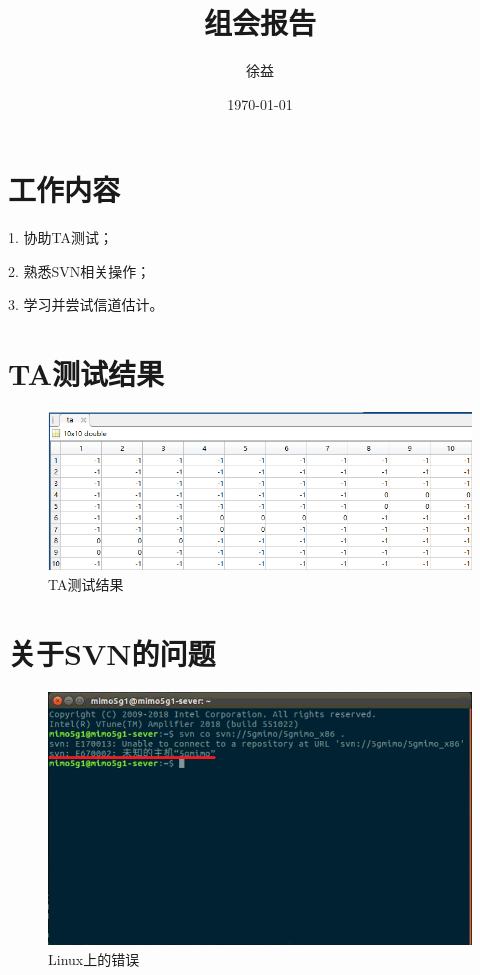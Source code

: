 \documentclass{article}
\title{组会报告}
\author{徐益}
\date{\today}
\begin{document}
\maketitle


\section{工作内容}
1. 协助TA测试；

2. 熟悉SVN相关操作；

3. 学习并尝试信道估计。

\section{TA测试结果}
\begin{figure}[H]
	\centering
	\includegraphics[width = \textwidth]{ta.png}
	\caption{TA测试结果}
\end{figure}

\section{关于SVN的问题}
\begin{figure}[H]
	\centering
	\includegraphics[width = \textwidth]{svn.png}
	\caption{Linux上的错误}
\end{figure}
\end{document}
